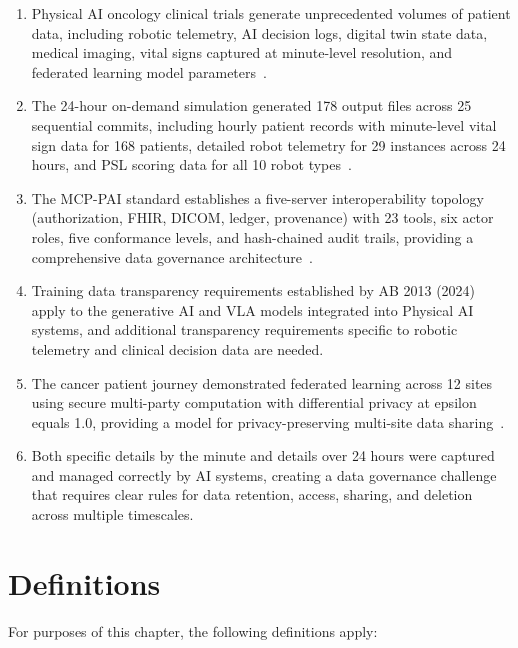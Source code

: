 \documentclass[11pt,letterpaper]{article}
\begin{document}
\begin{enumerate}[label=(\alph*)]
\item Physical AI oncology clinical trials generate unprecedented volumes of
  patient data, including robotic telemetry, AI decision logs, digital twin
  state data, medical imaging, vital signs captured at minute-level resolution,
  and federated learning model parameters~\cite{newtrial2026}.

\item The 24-hour on-demand simulation generated 178 output files across 25
  sequential commits, including hourly patient records with minute-level vital
  sign data for 168 patients, detailed robot telemetry for 29 instances across
  24 hours, and PSL scoring data for all 10 robot
  types~\cite{newtrial2026}.

\item The MCP-PAI standard establishes a five-server interoperability topology
  (authorization, FHIR, DICOM, ledger, provenance) with 23 tools, six actor
  roles, five conformance levels, and hash-chained audit trails, providing a
  comprehensive data governance architecture~\cite{iche6r3adapt}.

\item Training data transparency requirements established by AB 2013 (2024)
  apply to the generative AI and VLA models integrated into Physical AI
  systems, and additional transparency requirements specific to robotic
  telemetry and clinical decision data are needed.

\item The cancer patient journey demonstrated federated learning across 12 sites
  using secure multi-party computation with differential privacy at epsilon
  equals 1.0, providing a model for privacy-preserving multi-site data
  sharing~\cite{patientjourney2026}.

\item Both specific details by the minute and details over 24 hours were
  captured and managed correctly by AI systems, creating a data governance
  challenge that requires clear rules for data retention, access, sharing, and
  deletion across multiple timescales.
\end{enumerate}

\section{Definitions}

For purposes of this chapter, the following definitions apply:
\end{document}
